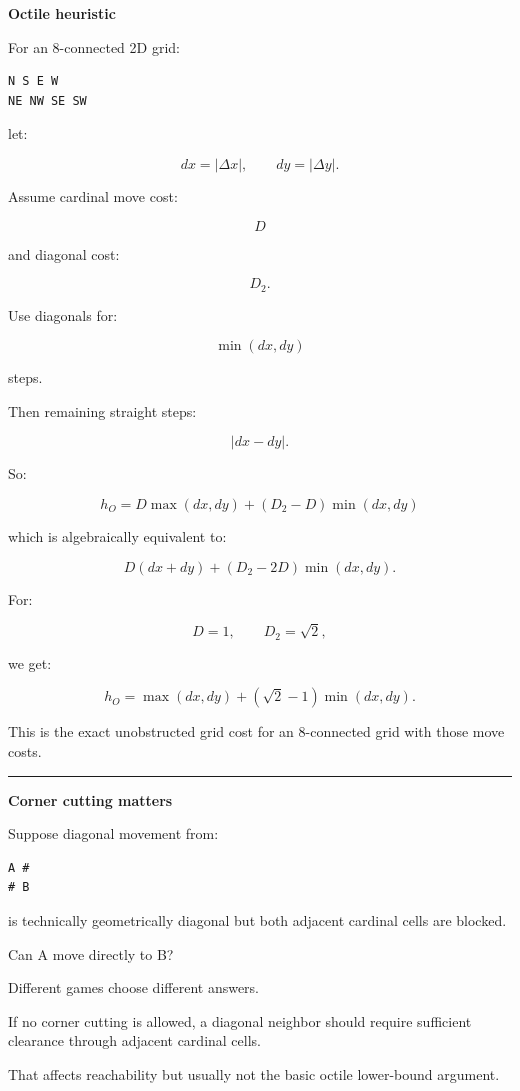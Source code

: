 \textbf{Octile heuristic}

For an 8-connected 2D grid:

\begin{verbatim}
N S E W
NE NW SE SW
\end{verbatim}

let:

\[
dx=|\Delta x|,
\qquad
dy=|\Delta y|.
\]

Assume cardinal move cost:

\[
D
\]

and diagonal cost:

\[
D_2.
\]

Use diagonals for:

\[
\min(dx,dy)
\]

steps.

Then remaining straight steps:

\[
|dx-dy|.
\]

So:

\[
\boxed{
h_O
=
D\max(dx,dy)
+
(D_2-D)\min(dx,dy)
}
\]

which is algebraically equivalent to:

\[
D(dx+dy)
+
(D_2-2D)\min(dx,dy).
\]

For:

\[
D=1,
\qquad
D_2=\sqrt2,
\]

we get:

\[
\boxed{
h_O
=
\max(dx,dy)
+
(\sqrt2-1)\min(dx,dy).
}
\]

This is the exact unobstructed grid cost for an 8-connected grid with those move costs.

\begin{center}\rule{0.5\linewidth}{0.5pt}\end{center}

\textbf{Corner cutting matters}

Suppose diagonal movement from:

\begin{verbatim}
A #
# B
\end{verbatim}

is technically geometrically diagonal but both adjacent cardinal cells are blocked.

Can A move directly to B?

Different games choose different answers.

If no corner cutting is allowed, a diagonal neighbor should require sufficient clearance through adjacent cardinal cells.

That affects reachability but usually not the basic octile lower-bound argument.

